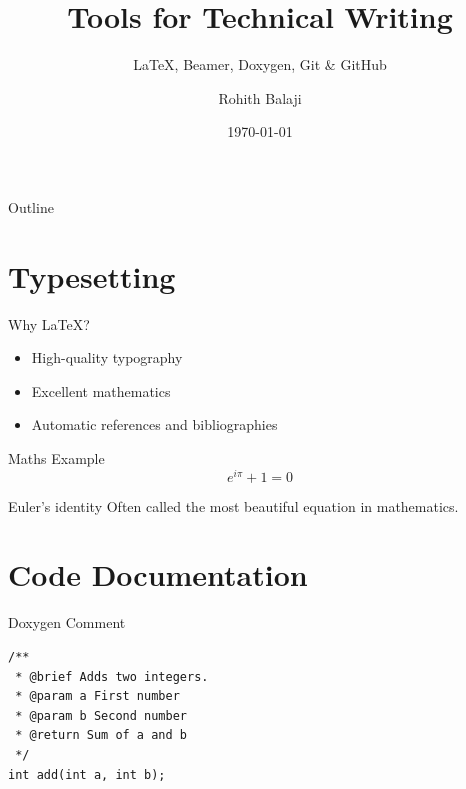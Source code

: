 \documentclass{beamer}
\title{Tools for Technical Writing}
\subtitle{LaTeX, Beamer, Doxygen, Git \& GitHub}
\author{Rohith Balaji}
\institute{MNIT Jaipur}
\date{\today}
\begin{document}
\begin{frame}
  \titlepage
\end{frame}

\begin{frame}{Outline}
  \tableofcontents
\end{frame}

\section{Typesetting}
\begin{frame}{Why LaTeX?}
  \begin{itemize}
    \item<1-> High-quality typography
    \item<2-> Excellent mathematics
    \item<3-> Automatic references and bibliographies
  \end{itemize}
\end{frame}

\begin{frame}{Maths Example}
  \begin{equation*}
    e^{i\pi} + 1 = 0
  \end{equation*}
  \begin{alertblock}{Euler's identity}
    Often called the most beautiful equation in mathematics.
  \end{alertblock}
\end{frame}

\section{Code Documentation}
\begin{frame}[fragile]{Doxygen Comment}
\begin{verbatim}
/**
 * @brief Adds two integers.
 * @param a First number
 * @param b Second number
 * @return Sum of a and b
 */
int add(int a, int b);
\end{verbatim}
\end{frame}
\end{document}
